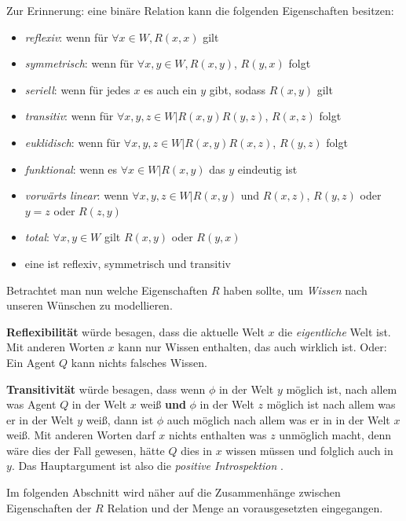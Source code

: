 Zur Erinnerung: eine binäre Relation kann die folgenden Eigenschaften besitzen:
\begin{itemize}
	\item \emph{reflexiv}: wenn für $\forall x \in W, R(x,x)$ gilt
	\item \emph{symmetrisch}: wenn für $\forall x,y \in W, R(x,y)$, $R(y,x)$ folgt
	\item \emph{seriell}: wenn für jedes $x$ es auch ein $y$ gibt, sodass $R(x,y)$ gilt
	\item \emph{transitiv}: wenn für $\forall x,y,z \in W | R(x,y) R(y,z)$, $R(x,z)$ folgt
	\item \emph{euklidisch}: wenn für $\forall x,y,z \in W | R(x,y) R(x,z)$, $R(y,z)$ folgt
	\item \emph{funktional}: wenn es $\forall x \in W | R(x,y)$ das $y$ eindeutig ist
	\item \emph{vorwärts linear}: wenn $\forall x,y,z \in W | R(x,y)$ und $R(x,z)$, $R(y,z)$ oder $y=z$ oder $R(z,y)$
	\item \emph{total}: $\forall x,y \in W$ gilt $R(x,y)$ oder $R(y,x)$
	\item eine \emph{\EQRef} ist reflexiv, symmetrisch und transitiv
\end{itemize}

Betrachtet man nun welche Eigenschaften $R$ haben sollte, um \emph{Wissen} nach unseren Wünschen zu modellieren.

\textbf{Reflexibilität} würde besagen, dass die aktuelle Welt $x$ die \emph{eigentliche} Welt ist.
Mit anderen Worten $x$ kann nur Wissen enthalten, das auch wirklich \true ist.
Oder: Ein Agent $Q$ kann nichts falsches Wissen.

\textbf{Transitivität} würde besagen, dass wenn $\phi$ in der Welt $y$ möglich ist, nach allem was Agent $Q$ in der Welt $x$ weiß \textbf{und} $\phi$ in der Welt $z$ möglich ist nach allem was er in der Welt $y$ weiß, dann ist $\phi$ auch möglich nach allem was er in  in der Welt $x$ weiß.
Mit anderen Worten darf $x$ nichts enthalten was $z$ unmöglich macht, denn wäre dies der Fall gewesen, hätte $Q$ dies in $x$ wissen müssen und folglich auch in $y$.
Das Hauptargument ist also die \emph{positive Introspektion} \vierFormel {}.

Im folgenden Abschnitt wird näher auf die Zusammenhänge zwischen Eigenschaften der $R$ Relation und der Menge an vorausgesetzten \formelSchemata eingegangen.







